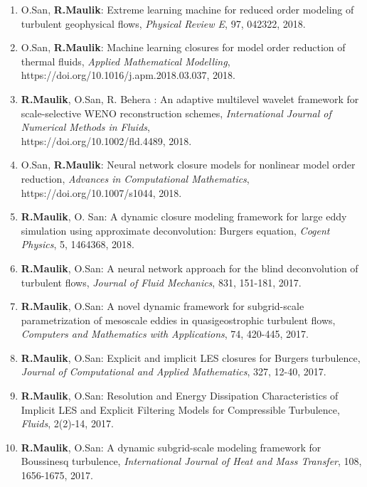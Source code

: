\documentclass[letterpaper]{article}
\begin{document}
\begin{enumerate}
\item O.San, \textbf{R.Maulik}: Extreme learning machine for reduced order modeling of turbulent geophysical flows, {\it Physical Review E}, 97, 042322, 2018.

\item O.San, \textbf{R.Maulik}: Machine learning closures for model order reduction of thermal fluids,  {\it Applied Mathematical Modelling}, https://doi.org/10.1016/j.apm.2018.03.037, 2018.

\item \textbf{R.Maulik}, O.San, R. Behera : An adaptive multilevel wavelet framework for scale-selective WENO reconstruction schemes, {\it International Journal of Numerical Methods in Fluids},\\ https://doi.org/10.1002/fld.4489, 2018.

\item O.San, \textbf{R.Maulik}: Neural network closure models for nonlinear model order reduction, {\it Advances in Computational Mathematics}, https://doi.org/10.1007/s1044, 2018.

\item \textbf{R.Maulik}, O. San: A dynamic closure modeling framework for large eddy simulation using approximate deconvolution: Burgers equation, {\it Cogent Physics}, 5, 1464368, 2018.

\item \textbf{R.Maulik}, O.San: A neural network approach for the blind deconvolution of turbulent flows, {\it Journal of Fluid Mechanics}, 831, 151-181, 2017.

\item \textbf{R.Maulik}, O.San: A novel dynamic framework for subgrid-scale parametrization of mesoscale eddies in quasigeostrophic turbulent flows, {\it Computers and Mathematics with Applications}, 74, 420-445, 2017.

\item \textbf{R.Maulik}, O.San: Explicit and implicit LES closures for Burgers turbulence, {\it Journal of Computational and Applied Mathematics}, 327, 12-40, 2017.

\item \textbf{R.Maulik}, O.San: Resolution and Energy Dissipation Characteristics of Implicit LES and Explicit Filtering Models for Compressible Turbulence, {\it Fluids}, 2(2)-14, 2017.

\item \textbf{R.Maulik}, O.San: A dynamic subgrid-scale modeling framework for Boussinesq turbulence, {\it International Journal of Heat and Mass Transfer}, 108, 1656-1675, 2017.


\end{enumerate}
\end{document}
